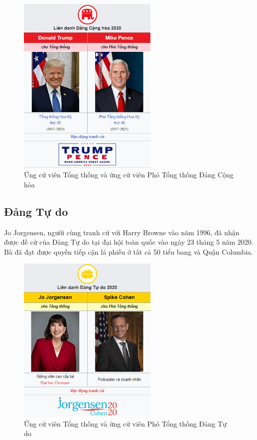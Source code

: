 \documentclass[14pt, a4paper]{article}
\numberwithin{equation}{section}
\numberwithin{figure}{section}
\numberwithin{dl}{section}
\numberwithin{md}{section}
\numberwithin{bd}{section}
\numberwithin{dn}{section}
\numberwithin{hq}{section}
\begin{document}
    \begin{figure}[h!]
        \centering
        \includegraphics[width=0.6\textwidth]{Rep_Candidates.png}
        \caption{Ứng cử viên Tổng thống và ứng cử viên Phó Tổng thống Đảng Cộng hòa}
    \end{figure}

    \subsection{Đảng Tự do}

    Jo Jorgensen, người cùng tranh cử với Harry Browne vào năm 1996, đã nhận được đề cử của Đảng Tự do tại đại hội toàn quốc vào ngày 23 tháng 5 năm 2020.
    Bà đã đạt được quyền tiếp cận lá phiếu ở tất cả 50 tiểu bang và Quận Columbia.

    \begin{figure}[h!]
        \centering
        \includegraphics[width=0.6\textwidth]{Lib_Candidates.png}
        \caption{Ứng cử viên Tổng thống và ứng cử viên Phó Tổng thống Đảng Tự do}
    \end{figure}
\end{document}
